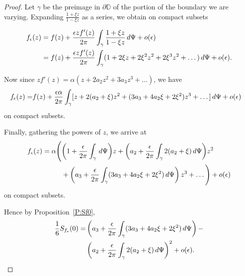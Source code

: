 \documentclass{lms}
\newcommand{\D}{\mathbb D}
\numberwithin{equation}{section}
\begin{document}
\begin{proof}

Let $\gamma$ be the preimage in $\partial \D$ of the portion of the 
boundary we are varying.  Expanding $\frac{1+\xi z}{1-\xi z}$ as a 
series, we obtain on compact subsets

\begin{align}\notag
f_\epsilon(z)&=f(z) + \frac{\epsilon z f^\prime(z)}{2\pi} 
\int_\gamma \frac{1 +\xi z}{1- \xi z} \,d\Psi + o(\epsilon) \\\notag
&= f(z) + \frac{\epsilon z f^\prime(z)}{2\pi} 
\int_\gamma (1+2 \xi z+2 \xi^2 z^2 +2 \xi^3 z^2 +\dots)\, d\Psi+o(\epsilon).
\end{align}

Now since $zf'(z)=\alpha(z+2a_2 z^2 + 3 a_3 z^3 +\dots)$, we have
\begin{align}\notag
f_\epsilon(z) = 
& f(z)+\frac{\epsilon\alpha}{2\pi}\int_\gamma 
[z + 2(a_2 + \xi) z^2 + (3a_3 + 4a_2 \xi +2\xi^2)z^3 +\dots] \, d\Psi +
o(\epsilon)
\end{align}
on compact subsets.

Finally, gathering the powers of $z$, we arrive at
\begin{align}\label{E:fepsilon}
f_\epsilon(z)=\alpha\Biggl(& 
\biggl(1+\frac{\epsilon}{2\pi} \int_\gamma \, d\Psi\biggr) z+
\biggl(a_2+\frac{\epsilon}{2\pi} \int_\gamma 2(a_2+\xi)\, d\Psi\biggr)z^2\\\notag
& +
\left(a_3+\frac{\epsilon}{2\pi} \int_\gamma (3a_3+4a_2\xi+2\xi^2) \, d\Psi\right)z^3
+ \dots \Biggr)+o(\epsilon)
\end{align}
on compact subsets.

Hence by Proposition~\ref{P:Sf0},
\begin{align}\notag
\frac{1}{6} S_{f_\epsilon}(0) = 
&\left(a_3 +\frac{\epsilon}{2\pi}\int_\gamma (3a_3+4a_2\xi+2\xi^2) 
\, d\Psi\right)-
\\\notag
&\left(a_2+ \frac{\epsilon}{2\pi}\int_\gamma 2(a_2+\xi)\,d\Psi\right)^2
+o(\epsilon).
\end{align}


\end{proof}
\end{document}
